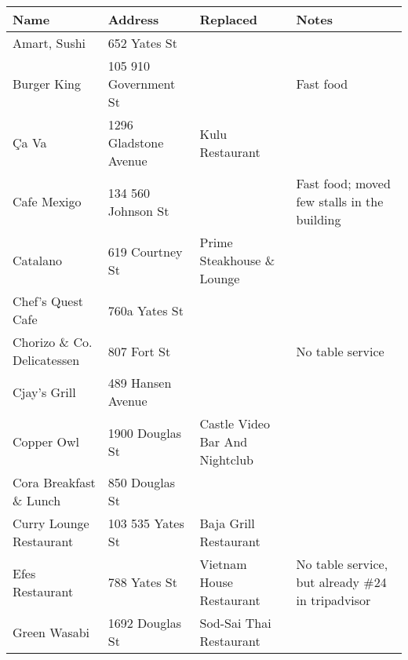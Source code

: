 \documentclass[9pt]{article}
\begin{document}
\begin{tabular}{p{5cm}|p{3.7cm}|p{4.8cm}|p{4cm}}
\textbf{Name} & \textbf{Address} & \textbf{Replaced} & \textbf{Notes}\\
\hline
Amart, Sushi                            & 652 Yates St          &                                           &                                  \\
Burger King                             & 105 910 Government St &                                           &  Fast food                                \\
Ça Va                                   & 1296 Gladstone Avenue & Kulu Restaurant                           &                                  \\
Cafe Mexigo                             & 134 560 Johnson St    &                                           & Fast food; moved few stalls in the building \\
Catalano                                & 619 Courtney St       & Prime Steakhouse \& Lounge                                           &                                  \\
Chef's Quest Cafe                       & 760a Yates St         &                                           &                                  \\
Chorizo \& Co. Delicatessen             & 807 Fort St           &                                           &  No table service                                \\
Cjay's Grill                            & 489 Hansen Avenue     &                                           &                                  \\
Copper Owl                              & 1900 Douglas St       & Castle Video Bar And Nightclub            &                                  \\
Cora Breakfast \& Lunch                 & 850 Douglas St        &                                           &                                  \\
Curry Lounge Restaurant                 & 103 535 Yates St      & Baja Grill Restaurant                     &                                  \\
Efes Restaurant                            & 788 Yates St                & Vietnam House Restaurant          &  No table service, but already \#24 in tripadvisor               \\
Green Wasabi                               & 1692 Douglas St             & Sod-Sai Thai Restaurant           &                 \\

\end{tabular}
\end{document}
